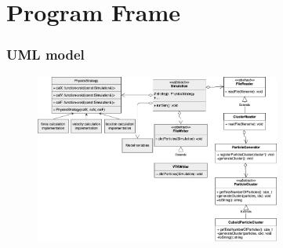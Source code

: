 
\section{Program Frame}

\begin{frame}
    \frametitle{UML model}


    \begin{figure}[H]
        \includegraphics[width=0.72\textwidth]{res/UML.png}
    \end{figure}


\end{frame}
